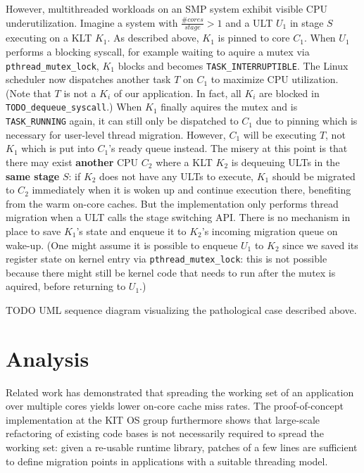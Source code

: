 \documentclass[12pt,a4paper]{article}
\begin{document}
However, multithreaded workloads on an SMP system exhibit visible CPU underutilization.
Imagine a system with $\frac{\#cores}{stage} > 1$ and a ULT $U_1$ in stage $S$ executing on a KLT $K_1$.
As described above, $K_1$ is pinned to core $C_1$.
When $U_1$ performs a blocking syscall, for example waiting to aquire a mutex via \texttt{pthread\_mutex\_lock}, $K_1$ blocks and becomes \texttt{TASK\_INTERRUPTIBLE}.
The Linux scheduler now dispatches another task $T$ on $C_1$ to maximize CPU utilization.
(Note that $T$ is not a $K_i$ of our application. In fact, all $K_i$ are blocked in \texttt{TODO\_dequeue\_syscall}.)
When $K_1$ finally aquires the mutex and is \texttt{TASK\_RUNNING} again, it can still only be dispatched to $C_1$ due to pinning which is necessary for user-level thread migration.
However, $C_1$ will be executing $T$, not $K_1$ which is put into $C_1$'s ready queue instead.
The misery at this point is that there may exist \textbf{another} CPU $C_2$ where a KLT $K_2$ is dequeuing ULTs in the \textbf{same stage} $S$:
if $K_2$ does not have any ULTs to execute, $K_1$ should be migrated to $C_2$ immediately when it is woken up and continue execution there, benefiting from the warm on-core caches.
But the implementation only performs thread migration when a ULT calls the stage switching API.
There is no mechanism in place to save $K_1$'s state and enqueue it to $K_2$'s incoming migration queue on wake-up.
(One might assume it is possible to enqueue $U_1$ to $K_2$ since we saved its register state on kernel entry via \texttt{pthread\_mutex\_lock}:
this is not possible because there might still be kernel code that needs to run after the mutex is aquired, before returning to $U_1$.)

TODO UML sequence diagram visualizing the pathological case described above.

\clearpage
\section{Analysis}\label{sec:analysis}
Related work has demonstrated that spreading the working set of an application over multiple cores yields lower on-core cache miss rates.
The proof-of-concept implementation at the KIT OS group furthermore shows that large-scale refactoring of existing code bases is not necessarily required to spread the working set:
given a re-usable runtime library, patches of a few lines are sufficient to define migration points in applications with a suitable threading model.
\end{document}
